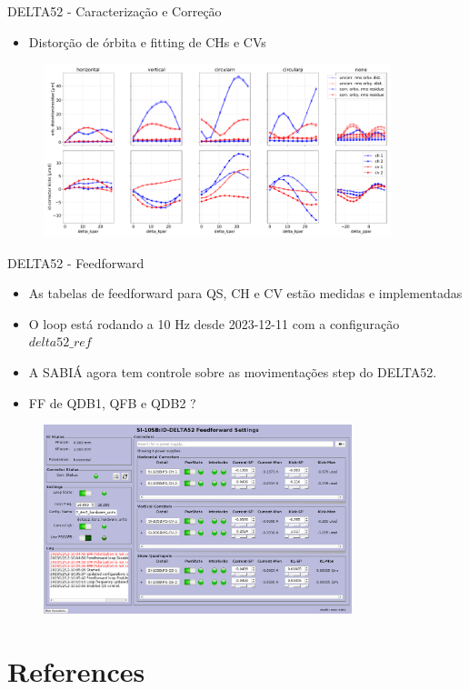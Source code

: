 \documentclass{beamer}					  %
\begin{document}
\begin{frame}{DELTA52 - Caracterização e Correção}
    \begin{itemize}
    		\item Distorção de órbita e fitting de CHs e CVs
    \end{itemize}
    \begin{figure}[H]
        	\centering
            \includegraphics[width=0.9\textwidth]{2023-12-12/figures/orbcorr_ff.pdf}
            \label{fig:bba}
    \end{figure} 
\end{frame}

\begin{frame}{DELTA52 - Feedforward}
    \scriptsize{\begin{itemize}
    		\item As tabelas de feedforward para QS, CH e CV estão medidas e implementadas
            \item O loop está rodando a 10 Hz desde 2023-12-11 com a configuração $delta52\_ref$
            \item A SABIÁ agora tem controle sobre as movimentações step do DELTA52.
            \item FF de QDB1, QFB e QDB2 ?
    \end{itemize}}
    \begin{figure}[H]
        	\centering
            \includegraphics[width=0.8\textwidth]{2023-12-12/figures/idff.png}
            \label{fig:bba}
    \end{figure} 
\end{frame}





\section{References}
\end{document}
